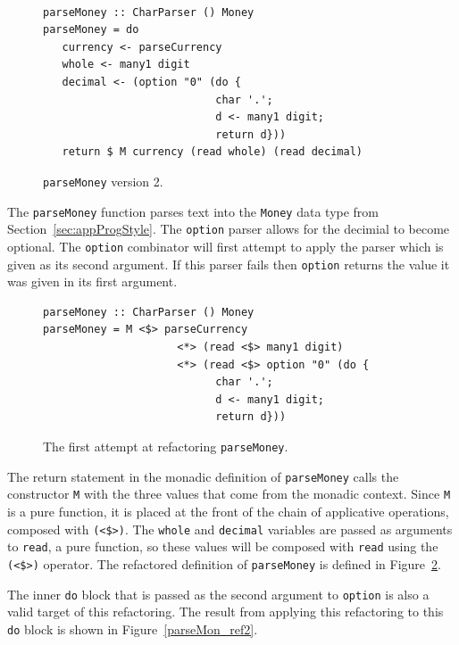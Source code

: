 \begin{figure}[t]
\begin{lstlisting}

parseMoney :: CharParser () Money
parseMoney = do
   currency <- parseCurrency 
   whole <- many1 digit
   decimal <- (option "0" (do { 
                           char '.';
                           d <- many1 digit;
                           return d}))
   return $ M currency (read whole) (read decimal)
\end{lstlisting}
\caption{\texttt{parseMoney} version 2.}
\label{pMoney2}
\end{figure}

The \texttt{parseMoney} function parses text into the \texttt{Money} data type from Section~\ref{sec:appProgStyle}. The \texttt{option} parser allows for the decimial to become optional. The \texttt{option} combinator will first attempt to apply the parser which is given as its second argument. If this parser fails then \texttt{option} returns the value it was given in its first argument.

\begin{figure}[t]
\begin{lstlisting}
parseMoney :: CharParser () Money
parseMoney = M <$> parseCurrency 
		             <*> (read <$> many1 digit) 
		             <*> (read <$> option "0" (do { 
                           char '.';
                           d <- many1 digit;
                           return d}))
\end{lstlisting}
\caption{The first attempt at refactoring \texttt{parseMoney}.}
\label{parseMon_ref1}
\end{figure}


The return statement in the monadic definition of \texttt{parseMoney} calls the constructor \texttt{M} with the three values that come from the monadic context. Since \texttt{M} is a pure function, it is placed at the front of the chain of applicative operations, composed with \texttt{(<\$>)}. The \texttt{whole} and \texttt{decimal} variables are passed as arguments to \texttt{read}, a pure function, so these values will be composed with \texttt{read} using the \texttt{(<\$>)} operator. The refactored definition of \texttt{parseMoney} is defined in Figure~\ref{parseMon_ref1}.

The inner \texttt{do} block that is passed as the second argument to \texttt{option} is also a valid target of this refactoring. The result from applying this refactoring to this \texttt{do} block is shown in Figure~\ref{parseMon_ref2}.

